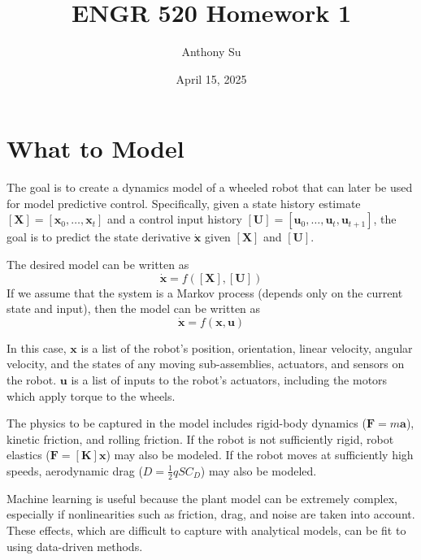 \documentclass[11pt]{article}
\title{ENGR 520 Homework 1}
\author{Anthony Su}
\date{April 15, 2025}
\begin{document}


\section{What to Model}

The goal is to create a dynamics model of a wheeled robot that can later be used for model predictive control. Specifically, given a state history estimate $[\mathbf{X}] = [\boldsymbol{x}_0, \dots, \boldsymbol{x}_t]$ and a control input history $[\mathbf{U}] = [\boldsymbol{u}_0, \dots, \boldsymbol{u}_t, \boldsymbol{u}_{t+1}]$, the goal is to predict the state derivative $\dot{\boldsymbol{x}}$ given $[\mathbf{X}]$ and $[\mathbf{U}]$.

The desired model can be written as
\begin{equation}
    \dot{\boldsymbol{x}} = f([\mathbf{X}], [\mathbf{U}])
\end{equation}
If we assume that the system is a Markov process (depends only on the current state and input), then the model can be written as
\begin{equation}
    \dot{\boldsymbol{x}} = f(\boldsymbol{x}, \boldsymbol{u})
\end{equation}

In this case, $\boldsymbol{x}$ is a list of the robot's position, orientation, linear velocity, angular velocity, and the states of any moving sub-assemblies, actuators, and sensors on the robot. $\boldsymbol{u}$ is a list of inputs to the robot's actuators, including the motors which apply torque to the wheels.

The physics to be captured in the model includes rigid-body dynamics ($\boldsymbol{F}=m\boldsymbol{a}$), kinetic friction, and rolling friction. If the robot is not sufficiently rigid, robot elastics ($\boldsymbol{F}=[\mathbf{K}]\boldsymbol{x}$) may also be modeled. If the robot moves at sufficiently high speeds, aerodynamic drag ($D=\frac{1}{2} q S C_D$) may also be modeled.

Machine learning is useful because the plant model can be extremely complex, especially if nonlinearities such as friction, drag, and noise are taken into account. These effects, which are difficult to capture with analytical models, can be fit to using data-driven methods.
\end{document}
